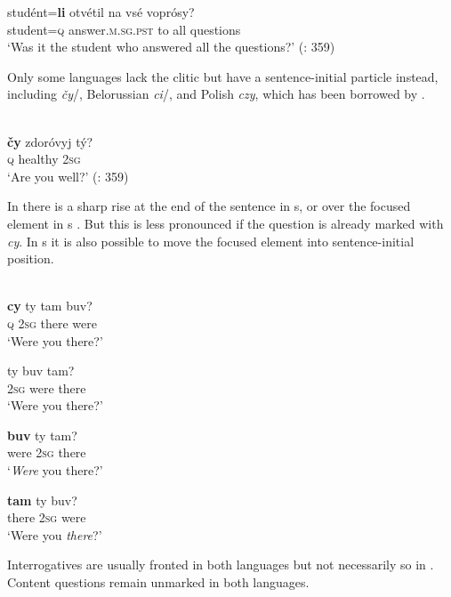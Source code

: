     \ex
    \gll studént=\textbf{li} otvétil      na  vsé  voprósy?\\
    student=\textsc{q}  answer.\textsc{m}.\textsc{sg}.\textsc{pst}  to  all  questions\\
    \glt ‘Was it the student who answered all the questions?’ (\citealt{SussexCubberley2006}: 359)
    \z
    \z

\noindent Only some languages lack the clitic but have a sentence-initial particle instead, including  \textit{čy}/, Belorussian \textit{ci}/, and Polish \textit{czy}, which has been borrowed by .

\ea%
    \label{ex:indo:17}
    \\
    \gll \textbf{{čy}} zdoróvyj  tý?\\
    \textsc{q}  healthy    2\textsc{sg}\\
    \glt ‘Are you well?’ (\citealt{SussexCubberley2006}: 359)
    \z

\noindent In  there is a sharp rise at the end of the sentence in s, or over the focused element in s \citep[978]{Shevelov1993}. But this is less pronounced if the question is already marked with \textit{cy}. In s it is also possible to move the focused element into sentence-initial position.

\ea%
    \label{ex:indo:18}
    \\
    \ea
    \gll \textbf{{cy}} ty tam buv?\\
    \textsc{q}  2\textsc{sg}  there  were\\
    \glt ‘Were you there?’
    
    \ex
    \gll ty buv tam?\\
    2\textsc{sg}  were  there\\
    \glt ‘Were you there?’
    
    \ex
    \gll \textbf{{buv}} ty tam?\\
    were  2\textsc{sg}  there\\
    \glt ‘\textit{Were} you there?’
    
    \ex
    \gll \textbf{{tam}} ty buv?\\
    there  2\textsc{sg}  were\\
    \glt ‘Were you \textit{there}?’ \citep[978]{Shevelov1993}\z\z

Interrogatives are usually fronted in both languages but not necessarily so in . Content questions remain unmarked in both languages.

